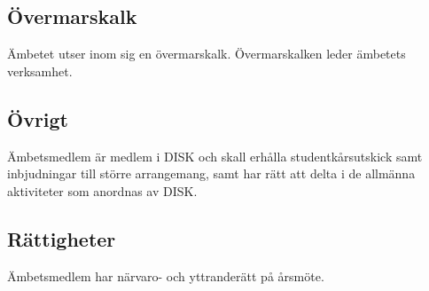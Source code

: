 	\subsection{Övermarskalk}
	\label{subsec:overmarskalk}
		Ämbetet utser inom sig en övermarskalk. Övermarskalken leder ämbetets verksamhet.

	\subsection{Övrigt}
	\label{subsec:ovrigt}
		Ämbetsmedlem är medlem i DISK och skall erhålla studentkårsutskick samt inbjudningar till större arrangemang, samt har rätt att delta i de allmänna aktiviteter som anordnas av DISK.

	\subsection{Rättigheter}
	\label{subsec:rattigheter}
		Ämbetsmedlem har närvaro- och yttranderätt på årsmöte.
